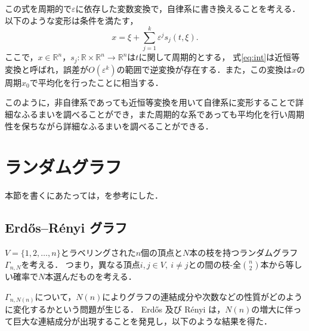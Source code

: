 \documentclass[../main]{subfiles}
\begin{document}
この式を周期的で$\varepsilon$に依存した変数変換で，自律系に書き換えることを考える．
以下のような変形は条件を満たす，
\begin{equation}
    \label{eq:int}
    x=\xi+\sum_{j=1}^k \varepsilon^j s_j(t,\xi).
\end{equation}
ここで，$x\in\mathbb{R}^n$，$s_j:\mathbb{R}\times\mathbb{R}^n\to\mathbb{R}^n$は$t$に関して周期的とする，
式\eqref{eq:int}は近恒等変換と呼ばれ，誤差が$O(\varepsilon^k)$の範囲で逆変換が存在する．また，この変換は$x$の周期$x_0$で平均化を行ったことに相当する．

このように，非自律系であっても近恒等変換を用いて自律系に変形することで詳細なふるまいを調べることができ，また周期的な系であっても平均化を行い周期性を保ちながら詳細なふるまいを調べることができる．
\section{ランダムグラフ}
本節を書くにあたっては，\cite{Bollobas2013,Albert2002}を参考にした．
\subsection{Erd\H{o}s–R\'{e}nyi グラフ}
\label{sec:er-graph}
$V=\{1,2,\ldots,n\}$とラベリングされた$n$個の頂点と$N$本の枝を持つランダムグラフ$\Gamma_{n,N}$を考える．
つまり，異なる頂点$i,j\in V,\ i\neq j$との間の枝-全$\binom{n}{2}$本から等しい確率で$N$本選んだものを考える．

$\Gamma_{n,N(n)}$について，$N(n)$によりグラフの連結成分や次数などの性質がどのように変化するかという問題が生じる．
Erd\H{o}s 及び R\'{e}nyi は，$N(n)$の増大に伴って巨大な連結成分が出現することを発見し，以下のような結果を得た．
\end{document}
